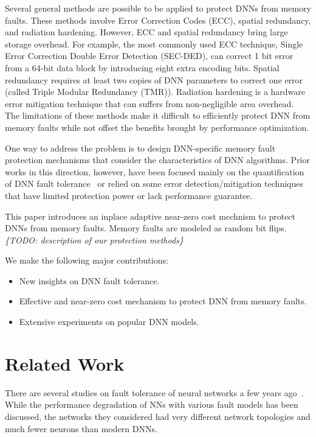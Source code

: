 \documentclass{article}
\newcommand{\TODO}[1]{{\it \color{blue}\{TODO: #1\}}}
\begin{document}
Several general methods are possible to be applied to protect DNNs from memory faults. These methods involve Error Correction Codes (ECC), spatial redundancy, and radiation hardening. However, ECC and spatial redundancy bring large storage overhead. For example, the most commonly used ECC technique, Single Error Correction Double Error Detection (SEC-DED), can correct 1 bit error from a 64-bit data block by introducing eight extra encoding bits. Spatial redundancy requires at least two copies of DNN parameters to correct one error (called Triple Modular Redundancy (TMR)). Radiation hardening is a hardware error mitigation technique that can suffers from non-negligible area overhead. The limitations of these methods make it difficult to efficiently protect DNN from memory faults while not offset the benefits brought by performance optimization.  

One way to address the problem is to design DNN-specific memory fault protection mechanisms that consider the characteristics of DNN algorithms. Prior works in this direction, however, have been focused mainly on the quantification of DNN fault tolerance~\cite{reagen2018ares, li2017understanding} or relied on some error detection/mitigation techniques~\cite{reagen2016minerva, azizimazreah2018tolerating} that have limited protection power or lack performance guarantee.  


This paper introduces an inplace adaptive near-zero cost mechnism to protect DNNs from memory faults. Memory faults are modeled as random bit flips.  
\TODO{ description of our protection methods}



We make the following major contributions:
\begin{itemize}
    \item New insights on DNN fault tolerance.
    \item Effective and near-zero cost mechanism to protect DNN from memory faults.
    \item Extensive experiments on popular DNN models. 
\end{itemize}


\section{Related Work}
There are several studies on fault tolerance of neural networks a few years ago~\cite{phatak1995complete, protzel1993performance, torres2017fault}. While the performance degradation of NNs with various fault models has been discussed, the networks they considered had very different network topologies and much fewer neurons than modern DNNs.  
\end{document}
